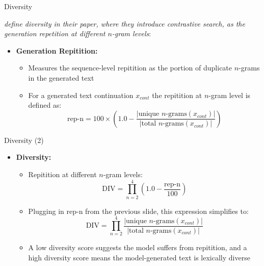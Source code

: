 
\begin{vbframe}{Diversity}

 \textit{define diversity in their paper, where they introduce contrastive search, as the generation repetition at different $n$-gram levels}:

\hspace{}

\begin{itemize}
    \item \textbf{Generation Repitition:}
    \begin{itemize}
        \item Measures the sequence-level repitition as the portion of duplicate $n$-grams in the generated text
        \item For a generated text continuation $x_{cont}$ the repitition at $n$-gram level is defined as: 
        $$\text{rep-n} = 100 \times \left(1.0 - \frac{|\text{unique $n$-grams}(x_{cont})|}{|\text{total $n$-grams}(x_{cont})|}\right)$$ 
    \end{itemize}
\end{itemize}

\end{vbframe}



\begin{vbframe}{Diversity (2)}

\vfill

\begin{itemize}
\item \textbf{Diversity:}
    \begin{itemize}
        \item Repitition at different $n$-gram levels:
        $$\text{DIV} = \prod_{n=2}^{4}\left(1.0 - \frac{\text{rep-n}}{100}\right)$$
        \item Plugging in rep-n from the previous slide, this expression simplifies to:
        $$\text{DIV} = \prod_{n=2}^{4} \frac{|\text{unique $n$-grams}(x_{cont})|}{|\text{total $n$-grams}(x_{cont})|}$$
        \item A low diversity score suggests the model suffers from repitition, and a high diversity score means the model-generated text is lexically diverse
    \end{itemize}
\end{itemize}

\vfill
        
\end{vbframe}

